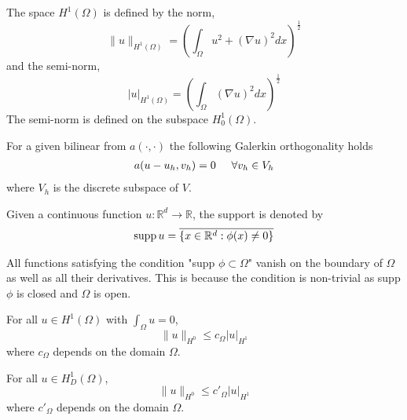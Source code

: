 \begin{definition}\label{def:semi_norm}
The space $H^1(\Omega)$ is defined by the norm, 
\begin{equation}
\|u\|_{H^1(\Omega)} = (\int_\Omega u^2 + (\nabla u)^2 dx)^\frac{1}{2}
\end{equation}
and the semi-norm,
\begin{equation}
|u|_{H^1(\Omega)} = (\int_\Omega (\nabla u)^2 dx)^\frac{1}{2}
\end{equation}
The semi-norm is defined on the subspace $H_0^1(\Omega)$.
\end{definition}

\begin{theorem}\label{def:galerkin}
For a given bilinear from $a(\cdot, \cdot)$ the following Galerkin orthogonality holds
\begin{align}
a(u-u_h, v_h) = 0 \hspace{0.5cm} \forall v_h \in V_h
\end{align}
where $V_h$ is the discrete subspace of $V$.
\end{theorem}

\begin{theorem}\label{def:support}
Given a continuous function $u : \mathbb{R}^d \rightarrow \mathbb{R}$, the support is denoted by 
\begin{align*}
\textnormal{supp} \, u = \overline{\{x \in \mathbb{R}^d : \phi(x) \neq 0\}}
\end{align*}
\end{theorem}
\begin{remark} All functions satisfying the condition "supp $\phi \subset \Omega$" vanish on the boundary of $\Omega$ as well as all their derivatives. This is because the condition is non-trivial as supp $\phi$ is closed and $\Omega$ is open. 
\end{remark}

\begin{theorem}\label{def:poincare}
For all $u \in H^1(\Omega)$ with $\int_\Omega u = 0$, 
\begin{equation}
\|u \|_{H^0} \leq c_\Omega |u|_{H^1}
\end{equation}
where $c_\Omega$ depends on the domain $\Omega$. 
\end{theorem}

\begin{theorem} \label{def:friedrich}
For all $u \in H^1_D(\Omega)$, 
\begin{equation}
\|u \|_{H^0} \leq c'_\Omega |u|_{H^1}
\end{equation}
where $c'_\Omega$ depends on the domain $\Omega$. 
\end{theorem}


